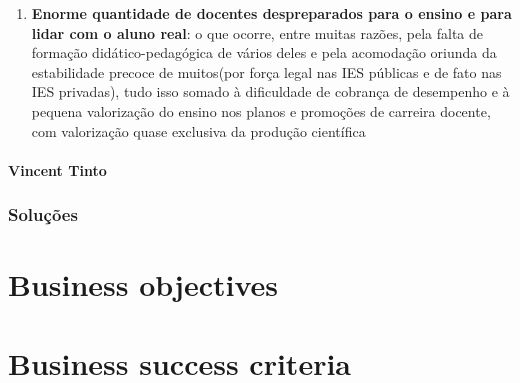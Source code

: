 \documentclass{report}
\begin{document}
\begin{enumerate}
\item \textbf{Enorme quantidade de docentes despreparados para o ensino e para lidar com o aluno real}: o que ocorre, entre muitas razões, pela falta de formação didático-pedagógica de vários deles e pela acomodação oriunda da estabilidade precoce de muitos(por força legal nas IES públicas e de fato nas IES privadas), tudo isso somado à dificuldade de cobrança de desempenho e à pequena valorização do ensino nos planos e promoções de carreira docente, com valorização quase exclusiva da produção científica

\end{enumerate}

\subsubsection{Vincent Tinto}

\subsection{Soluções}


\chapter{Business objectives}

\chapter{Business success criteria}

\cite{anuario_2014_base_2013}
\cite{pdi_ufc}



\end{document}
